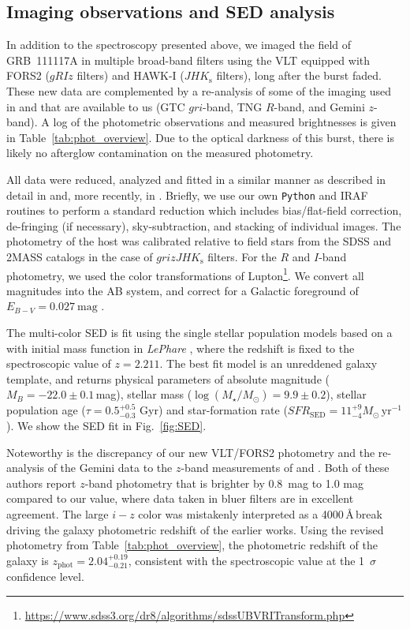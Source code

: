 \documentclass{aa}    %
\begin{document}
\subsection{Imaging observations and SED analysis} \label{SED}

In addition to the spectroscopy presented above, we imaged the field of
GRB~111117A in multiple broad-band filters using the VLT equipped with FORS2
($gRIz$ filters) and HAWK-I ($JHK_{\mathrm{s}}$ filters), long after the burst
faded. These new data are complemented by a re-analysis of some of the imaging
used in \citet{Margutti2012} and \citet{Sakamoto2013} that are available to us
(GTC $gri$-band, TNG $R$-band, and Gemini $z$-band). A log of the photometric
observations and measured brightnesses is given in
Table~\ref{tab:phot_overview}. Due to the optical darkness of this burst, there
is likely no afterglow contamination on the measured photometry.

All data were reduced, analyzed and fitted in a similar manner as described in
detail in \citet{Kruhler2011a} and, more recently, in \citet{Schulze2016}.
Briefly, we use our own \texttt{Python} and IRAF routines to perform a standard
reduction which includes bias/flat-field correction, de-fringing (if necessary),
sky-subtraction, and stacking of individual images. The photometry of the host
was calibrated relative to field stars from the SDSS and 2MASS catalogs in the
case of $grizJHK_{\mathrm{s}}$ filters.
For the $R$ and $I$-band photometry, we used the color transformations of
Lupton\footnote{\url{https://www.sdss3.org/dr8/algorithms/sdssUBVRITransform.php}}. 
We convert all magnitudes into the AB system, and correct for a Galactic 
foreground of $E_{B-V}=0.027~\mathrm{mag}$ \citep{Schlegel1998, Schlafly2011}.



The multi-color SED is fit using the \citet{Bruzual2003} single stellar population
models based on a \citet{Chabrier2003} with initial mass function in
\emph{LePhare} \citep{Ilbert2006}, where the redshift is fixed to the
spectroscopic value of $z=2.211$. The best fit model is an unreddened galaxy
template, and returns physical parameters of absolute magnitude
($M_B=-22.0\pm0.1$\,mag), stellar mass ($\log(M_{\star}/M_\odot) = 9.9\pm0.2$),
stellar population age ($\tau = 0.5_{-0.3}^{+0.5}$ Gyr) and star-formation rate
($SFR_{\mathrm{SED}}=11_{-4}^{+9} M_\odot\,\mathrm{yr}^{-1}$). We show the SED
fit in Fig.~\ref{fig:SED}.

Noteworthy is the discrepancy of our new VLT/FORS2 photometry and the
re-analysis of the Gemini data to the $z$-band measurements of
\citet{Margutti2012} and \citet{Sakamoto2013}. Both of these authors report
$z$-band photometry that is brighter by 0.8~mag to 1.0 mag compared to our
value, where data taken in bluer filters are in excellent agreement. The large
$i-z$ color was mistakenly interpreted as a 4000\,\AA\,break driving the galaxy
photometric redshift of the earlier works. Using the revised photometry from
Table~\ref{tab:phot_overview}, the photometric redshift of the galaxy is
$z_{\mathrm{phot}}=2.04_{-0.21}^{+0.19}$, consistent with the spectroscopic
value at the 1~$\sigma$ confidence level.
\end{document}
